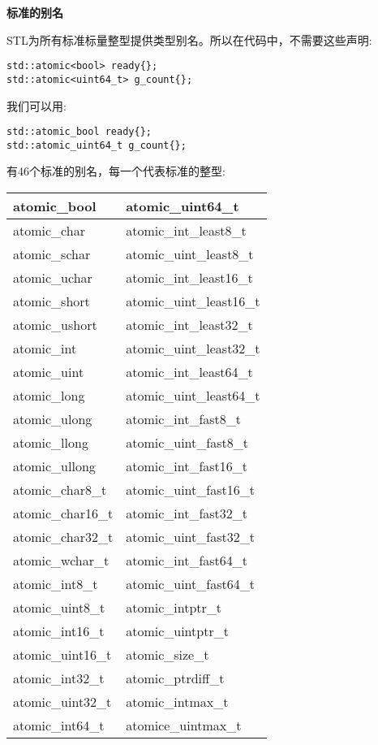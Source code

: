 \noindent
\textbf{标准的别名}

STL为所有标准标量整型提供类型别名。所以在代码中，不需要这些声明:

\begin{lstlisting}[style=styleCXX]
std::atomic<bool> ready{};
std::atomic<uint64_t> g_count{};
\end{lstlisting}

我们可以用:

\begin{lstlisting}[style=styleCXX]
std::atomic_bool ready{};
std::atomic_uint64_t g_count{};
\end{lstlisting}

有46个标准的别名，每一个代表标准的整型:

\begin{table}[H]
\centering
\begin{tabular}{|l|l|}
\hline
atomic\_bool      & atomic\_uint64\_t        \\ \hline
atomic\_char      & atomic\_int\_least8\_t   \\ \hline
atomic\_schar     & atomic\_uint\_least8\_t  \\ \hline
atomic\_uchar     & atomic\_int\_least16\_t  \\ \hline
atomic\_short     & atomic\_uint\_least16\_t \\ \hline
atomic\_ushort    & atomic\_int\_least32\_t  \\ \hline
atomic\_int       & atomic\_uint\_least32\_t \\ \hline
atomic\_uint      & atomic\_int\_least64\_t  \\ \hline
atomic\_long      & atomic\_uint\_least64\_t \\ \hline
atomic\_ulong     & atomic\_int\_fast8\_t    \\ \hline
atomic\_llong     & atomic\_uint\_fast8\_t   \\ \hline
atomic\_ullong    & atomic\_int\_fast16\_t   \\ \hline
atomic\_char8\_t  & atomic\_uint\_fast16\_t  \\ \hline
atomic\_char16\_t & atomic\_int\_fast32\_t   \\ \hline
atomic\_char32\_t & atomic\_uint\_fast32\_t  \\ \hline
atomic\_wchar\_t  & atomic\_int\_fast64\_t   \\ \hline
atomic\_int8\_t   & atomic\_uint\_fast64\_t  \\ \hline
atomic\_uint8\_t  & atomic\_intptr\_t        \\ \hline
atomic\_int16\_t  & atomic\_uintptr\_t       \\ \hline
atomic\_uint16\_t & atomic\_size\_t          \\ \hline
atomic\_int32\_t  & atomic\_ptrdiff\_t       \\ \hline
atomic\_uint32\_t & atomic\_intmax\_t        \\ \hline
atomic\_int64\_t  & atomice\_uintmax\_t      \\ \hline
\end{tabular}
\end{table}

